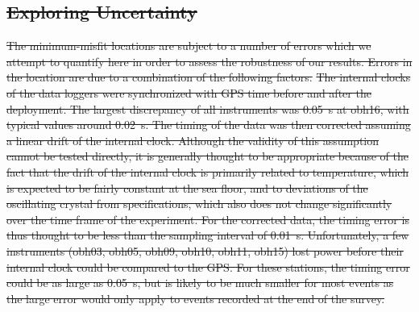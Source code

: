\documentclass[jgrga]{agu2001} %
\providecommand{\DIFdel}[1]{{\protect\color{red}\sout{#1}}}                      %
\begin{document}
\begin{article}
\section{\DIFdel{Exploring Uncertainty}}
\addtocounter{section}{-1}%

\DIFdel{The minimum-misfit locations are subject to a number of errors which
we attempt to quantify here in order to assess the robustness of our results.
   Errors in the location are due to a combination of
the following factors.
}%
\DIFdel{The internal clocks of the data loggers were
synchronized with GPS time before and after the deployment.  The
largest discrepancy of all instruments was 0.05~s at obh16, with
typical values around 0.02~s.  The
timing of the data was then corrected assuming a linear drift of the
internal clock. Although the validity of this assumption cannot be
tested directly, it is generally thought to be appropriate because of
the fact that the drift of the internal clock is primarily related to
temperature, which is expected to be fairly constant at
the sea floor, and to deviations of the oscillating crystal from
specifications, which also does not change significantly over the 
time frame of the experiment. For the corrected data, the timing error
is thus thought to be less than the sampling interval of 0.01~s.
Unfortunately, a few instruments (obh03,
obh05, obh09, obh10, obh11, obh15) lost
power before their internal clock could be compared to the GPS.  For
these stations, the timing error could be as large as 0.05~s, but is
likely to be much smaller for most events as the large error would
only apply to events recorded at the end of the survey.
}%


\end{article}
\end{document}
